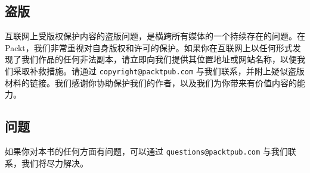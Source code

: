 \subsection{盗版}

互联网上受版权保护内容的盗版问题，是横跨所有媒体的一个持续存在的问题。在 Packt，我们非常重视对自身版权和许可的保护。如果你在互联网上以任何形式发现了我们作品的任何非法副本，请立即向我们提供其位置地址或网站名称，以便我们采取补救措施。请通过 \texttt{copyright@packtpub.\allowbreak{}com} 与我们联系，并附上疑似盗版材料的链接。我们感谢你协助保护我们的作者，以及我们为你带来有价值内容的能力。

\subsection{问题}

如果你对本书的任何方面有问题，可以通过 \texttt{questions@packtpub.\allowbreak{}com} 与我们联系，我们将尽力解决。
